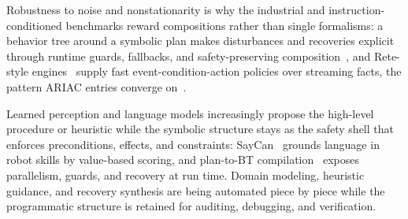 Robustness to noise and nonstationarity is why the industrial and instruction-conditioned benchmarks reward compositions rather than single formalisms: a behavior tree around a symbolic plan makes disturbances and recoveries explicit through runtime guards, fallbacks, and safety-preserving composition~\cite{Marzinotto2014BT,Colledanchise2017BT,Colledanchise2018BTbook}, and Rete-style engines~\cite{Forgy1982Rete} supply fast event-condition-action policies over streaming facts, the pattern ARIAC entries converge on~\cite{liu2024autonomous}.

Learned perception and language models increasingly propose the high-level procedure or heuristic while the symbolic structure stays as the safety shell that enforces preconditions, effects, and constraints: SayCan~\cite{ahn2022icanisay} grounds language in robot skills by value-based scoring, and plan-to-BT compilation~\cite{mart2021behaviourtree} exposes parallelism, guards, and recovery at run time. Domain modeling, heuristic guidance, and recovery synthesis are being automated piece by piece while the programmatic structure is retained for auditing, debugging, and verification.
